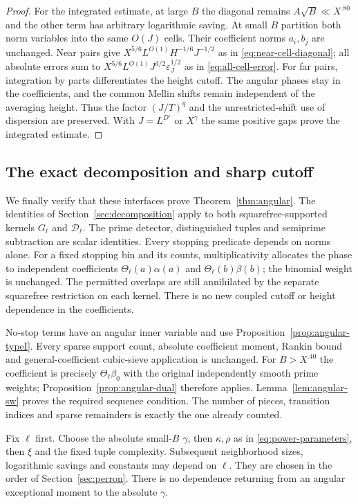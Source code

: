 \begin{proof}
For the integrated estimate, at large $B$ the diagonal remains
$A\sqrt B\ll X^{.80}$ and the other term has arbitrary
logarithmic saving. At small $B$ partition both norm variables
into the same $O(J)$ cells. Their coefficient norms $a_i,b_j$
are unchanged. Near pairs give
$X^{5/6}L^{O(1)}H^{-1/6}J^{-1/2}$ as in
\eqref{eq:near-cell-diagonal}; all absolute errors sum to
$X^{5/6}L^{O(1)}J^{3/2}\varepsilon_J^{1/2}$ as in
\eqref{eq:all-cell-error}. For far pairs, integration by parts
differentiates the height cutoff. The angular phases stay in
the coefficients, and the common Mellin shifts remain independent
of the averaging height. Thus the factor $(J/T)^q$ and the
unrestricted-shift use of dispersion are preserved. With
$J=L^{D'}$ or $X^\gamma$ the same positive gaps prove the
integrated estimate.
\end{proof}

\subsection{The exact decomposition and sharp cutoff}

We finally verify that these interfaces prove
Theorem~\ref{thm:angular}. The identities of
Section~\ref{sec:decomposition} apply to both squarefree-supported
kernels $G_\ell$ and $\mathcal D_\ell$. The prime detector,
distinguished tuples and semiprime subtraction are scalar
identities. Every stopping predicate depends on norms alone.
For a fixed stopping bin and its counts, multiplicativity
allocates the phase to independent coefficients
$\Theta_\ell(a)\alpha(a)$ and $\Theta_\ell(b)\beta(b)$;
the binomial weight is unchanged. The permitted overlaps are
still annihilated by the separate squarefree restriction on
each kernel. There is no new coupled cutoff or height dependence
in the coefficients.

No-stop terms have an angular inner variable and use
Proposition~\ref{prop:angular-typeI}. Every sparse support count,
absolute coefficient moment, Rankin bound and general-coefficient
cubic-sieve application is unchanged. For $B>X^{.40}$ the
coefficient is precisely $\Theta_\ell\beta_0$ with the original
independently smooth prime weights; Proposition~\ref{prop:angular-dual}
therefore applies. Lemma~\ref{lem:angular-sw} proves the required
sequence condition. The number of pieces, transition indices
and sparse remainders is exactly the one already counted.

Fix $\ell$ first. Choose the absolute small-$B$ $\gamma$,
then $\kappa,\rho$ as in \eqref{eq:power-parameters}, then
$\xi$ and the fixed tuple complexity. Subsequent neighborhood
sizes, logarithmic savings and constants may depend on $\ell$.
They are chosen in the order of Section~\ref{sec:perron}.
There is no dependence returning from an angular exceptional
moment to the absolute $\gamma$.

